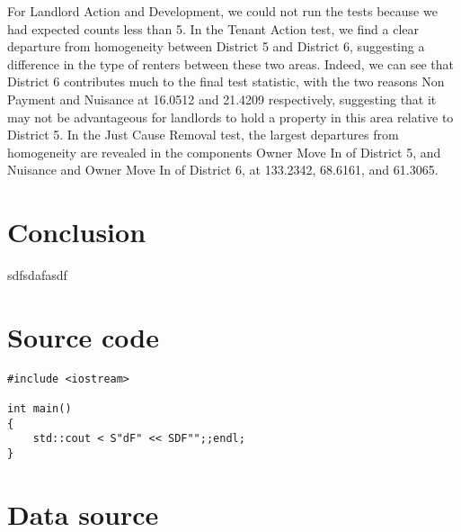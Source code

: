 \documentclass[]{article}
\begin{document}
For Landlord Action and Development, we could not run the tests because we had expected counts less than 5.
\newline\newline
In the Tenant Action test, we find a clear departure from homogeneity between District 5 and District 6, suggesting a difference in the type of renters between these two areas. Indeed, we can see that District 6 contributes much to the final test statistic, with the two reasons Non Payment and Nuisance at 16.0512 and 21.4209 respectively, suggesting that it may not be advantageous for landlords to hold a property in this area relative to District 5.
\newline\newline
In the Just Cause Removal test, the largest departures from homogeneity are revealed in the components Owner Move In of District 5, and Nuisance and Owner Move In of District 6, at 133.2342, 68.6161, and 61.3065.

\section{Conclusion}
sdfsdafasdf
\newpage
\appendix
\section{Source code}
\begin{lstlisting}
#include <iostream>

int main()
{
	std::cout < S"dF" << SDF"";;endl;
}
\end{lstlisting}

\section{Data source}
\end{document}
